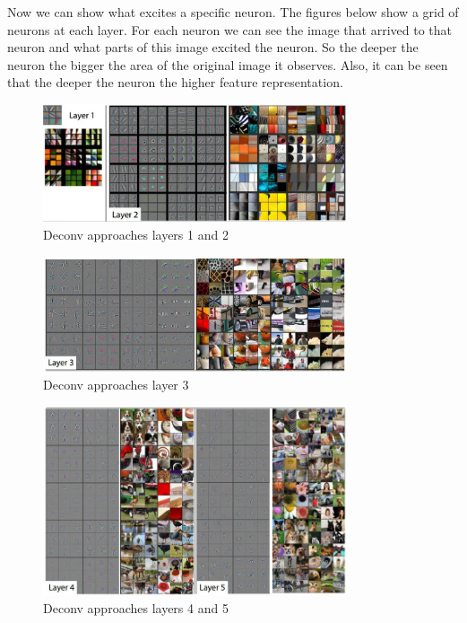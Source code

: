 Now we can show what excites a specific neuron. The figures below show a grid of neurons at each layer. For each neuron we can see the image that arrived to that neuron and what parts of this image excited the neuron. So the deeper the neuron the bigger the area of the original image it observes. Also, it can be seen that the deeper the neuron the higher feature representation.

\begin{figure}[h]
  \centering
  \includegraphics[width=0.8\textwidth]{Images/visualization/6.png}
  \caption{Deconv approaches layers 1 and 2}
\end{figure}

\begin{figure}[h]
  \centering
  \includegraphics[width=0.8\textwidth]{Images/visualization/7.png}
  \caption{Deconv approaches layer 3}
\end{figure}

\begin{figure}[h]
  \centering
  \includegraphics[width=0.8\textwidth]{Images/visualization/8.png}
  \caption{Deconv approaches layers 4 and 5}
\end{figure}


